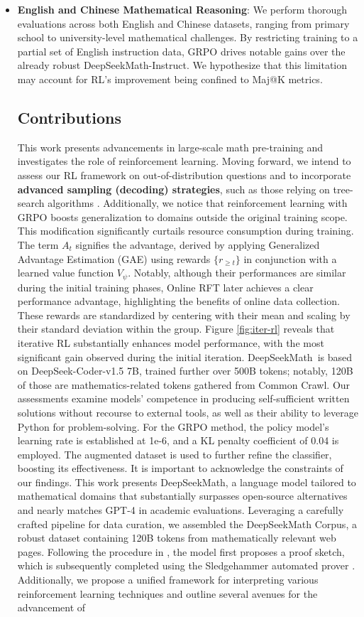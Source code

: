 \begin{itemize}[topsep=0pt]
    \item \textbf{English and Chinese Mathematical Reasoning}: We perform thorough evaluations across both English and Chinese datasets, ranging from primary school to university-level mathematical challenges. By restricting training to a partial set of English instruction data, GRPO drives notable gains over the already robust DeepSeekMath-Instruct. We hypothesize that this limitation may account for RL’s improvement being confined to Maj@K metrics. \subsection{Contributions}
This work presents advancements in large-scale math pre-training and investigates the role of reinforcement learning. Moving forward, we intend to assess our RL framework on out-of-distribution questions and to incorporate \textbf{advanced sampling (decoding) strategies}, such as those relying on tree-search algorithms \citep{yao2023tree}. Additionally, we notice that reinforcement learning with GRPO boosts generalization to domains outside the original training scope. This modification significantly curtails resource consumption during training. The term $A_t$ signifies the advantage, derived by applying Generalized Advantage Estimation (GAE) \citep{gae} using rewards $\{r_{\ge t}\}$ in conjunction with a learned value function $V_{\psi}$. Notably, although their performances are similar during the initial training phases, Online RFT later achieves a clear performance advantage, highlighting the benefits of online data collection. These rewards are standardized by centering with their mean and scaling by their standard deviation within the group. Figure \ref{fig:iter-rl} reveals that iterative RL substantially enhances model performance, with the most significant gain observed during the initial iteration. DeepSeekMath~is based on DeepSeek-Coder-v1.5 7B, trained further over 500B tokens; notably, 120B of those are mathematics-related tokens gathered from Common Crawl. Our assessments examine models' competence in producing self-sufficient written solutions without recourse to external tools, as well as their ability to leverage Python for problem-solving. For the GRPO method, the policy model’s learning rate is established at 1e-6, and a KL penalty coefficient of 0.04 is employed. The augmented dataset is used to further refine the classifier, boosting its effectiveness. It is important to acknowledge the constraints of our findings. This work presents DeepSeekMath, a language model tailored to mathematical domains that substantially surpasses open-source alternatives and nearly matches GPT-4 in academic evaluations. Leveraging a carefully crafted pipeline for data curation, we assembled the DeepSeekMath Corpus, a robust dataset containing 120B tokens from mathematically relevant web pages. Following the procedure in \cite{dsp_proof}, the model first proposes a proof sketch, which is subsequently completed using the Sledgehammer automated prover \citep{sledgehammer}. Additionally, we propose a unified framework for interpreting various reinforcement learning techniques and outline several avenues for the advancement of 
\end{itemize}
